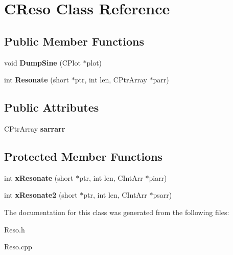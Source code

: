 \hypertarget{class_c_reso}{\section{C\-Reso Class Reference}
\label{class_c_reso}
}
\subsection*{Public Member Functions}
\begin{DoxyCompactItemize}
\item 
\hypertarget{class_c_reso_aa42204065054704e6755e7799465c724}{void {\bfseries Dump\-Sine} (C\-Plot $\ast$plot)}\label{class_c_reso_aa42204065054704e6755e7799465c724}

\item 
\hypertarget{class_c_reso_a2ac58cdf426636f22239ed1f23522717}{int {\bfseries Resonate} (short $\ast$ptr, int len, C\-Ptr\-Array $\ast$parr)}\label{class_c_reso_a2ac58cdf426636f22239ed1f23522717}

\end{DoxyCompactItemize}
\subsection*{Public Attributes}
\begin{DoxyCompactItemize}
\item 
\hypertarget{class_c_reso_a20237ea70c741167554e1dfae311221a}{C\-Ptr\-Array {\bfseries sarrarr}}\label{class_c_reso_a20237ea70c741167554e1dfae311221a}

\end{DoxyCompactItemize}
\subsection*{Protected Member Functions}
\begin{DoxyCompactItemize}
\item 
\hypertarget{class_c_reso_a5e826406f282a32e8126c942c2f309a5}{int {\bfseries x\-Resonate} (short $\ast$ptr, int len, C\-Int\-Arr $\ast$piarr)}\label{class_c_reso_a5e826406f282a32e8126c942c2f309a5}

\item 
\hypertarget{class_c_reso_a864274391bdbda3089cf48d493cafa8f}{int {\bfseries x\-Resonate2} (short $\ast$ptr, int len, C\-Int\-Arr $\ast$psarr)}\label{class_c_reso_a864274391bdbda3089cf48d493cafa8f}

\end{DoxyCompactItemize}


The documentation for this class was generated from the following files\-:\begin{DoxyCompactItemize}
\item 
Reso.\-h\item 
Reso.\-cpp\end{DoxyCompactItemize}
